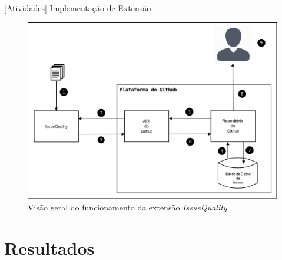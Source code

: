 \documentclass[t,14pt,mathserif]{beamer}
\begin{document}
\begin{frame}{[Atividades] Implementação de Extensão}

    \begin{figure}[htpb]
        \centering
        \includegraphics[width=0.657\linewidth]{../img/diagrama_funcionamento_issuequality.png}
        \caption{Visão geral do funcionamento da extensão \textit{IssueQuality}}
\label{fig:diagrama_funcionamento_issuequality}
    \end{figure}
\end{frame}

\section{Resultados}
\end{document}
